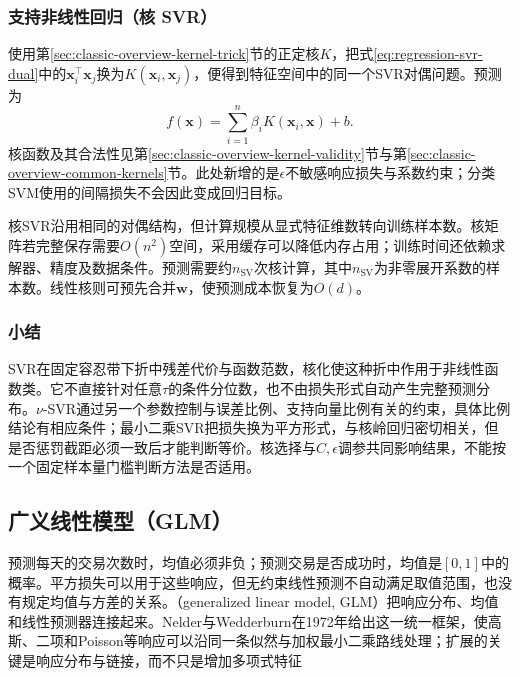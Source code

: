 \subsubsection{支持非线性回归（核 SVR）}
\label{sec:regression-kernel-svr}

使用第\ref{sec:classic-overview-kernel-trick}节的正定核$K$，把式\eqref{eq:regression-svr-dual}中的$\bm{x}_i^{\top}\bm{x}_j$换为$K(\bm{x}_i,\bm{x}_j)$，便得到特征空间中的同一个SVR对偶问题。预测为
\begin{equation}
  f(\bm{x})=\sum_{i=1}^{n}\beta_i K(\bm{x}_i,\bm{x})+b.
  \label{eq:regression-kernel-svr-prediction}
\end{equation}
核函数及其合法性见第\ref{sec:classic-overview-kernel-validity}节与第\ref{sec:classic-overview-common-kernels}节。此处新增的是$\epsilon$不敏感响应损失与系数约束；分类SVM使用的间隔损失不会因此变成回归目标。

核SVR沿用相同的对偶结构，但计算规模从显式特征维数转向训练样本数。核矩阵若完整保存需要$O(n^2)$空间，采用缓存可以降低内存占用；训练时间还依赖求解器、精度及数据条件。预测需要约$n_{\mathrm{SV}}$次核计算，其中$n_{\mathrm{SV}}$为非零展开系数的样本数。线性核则可预先合并$\bm{w}$，使预测成本恢复为$O(d)$。

\subsubsection{小结}

SVR在固定容忍带下折中残差代价与函数范数，核化使这种折中作用于非线性函数类。它不直接针对任意$\tau$的条件分位数，也不由损失形式自动产生完整预测分布。$\nu$-SVR通过另一个参数控制与误差比例、支持向量比例有关的约束，具体比例结论有相应条件；最小二乘SVR把损失换为平方形式，与核岭回归密切相关，但是否惩罚截距必须一致后才能判断等价。核选择与$C,\epsilon$调参共同影响结果，不能按一个固定样本量门槛判断方法是否适用。

\subsection{广义线性模型（GLM）}
\label{sec:regression-glm}

预测每天的交易次数时，均值必须非负；预测交易是否成功时，均值是$[0,1]$中的概率。平方损失可以用于这些响应，但无约束线性预测不自动满足取值范围，也没有规定均值与方差的关系。（generalized linear model, GLM）把响应分布、均值和线性预测器连接起来。Nelder与Wedderburn在1972年给出这一统一框架，使高斯、二项和Poisson等响应可以沿同一条似然与加权最小二乘路线处理；扩展的关键是响应分布与链接，而不只是增加多项式特征

